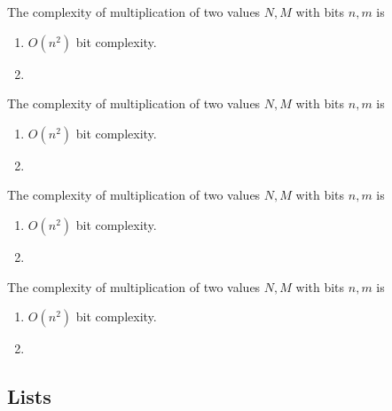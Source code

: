   \begin{theorem}
    The complexity of multiplication of two values $N, M$ with bits $n, m$ is 
    \begin{enumerate}
      \item $O(n^2)$ bit complexity. 
      \item 
    \end{enumerate}
  \end{theorem}

  \begin{theorem}
    The complexity of multiplication of two values $N, M$ with bits $n, m$ is 
    \begin{enumerate}
      \item $O(n^2)$ bit complexity. 
      \item 
    \end{enumerate}
  \end{theorem}

  \begin{theorem}
    The complexity of multiplication of two values $N, M$ with bits $n, m$ is 
    \begin{enumerate}
      \item $O(n^2)$ bit complexity. 
      \item 
    \end{enumerate}
  \end{theorem}

  \begin{theorem}
    The complexity of multiplication of two values $N, M$ with bits $n, m$ is 
    \begin{enumerate}
      \item $O(n^2)$ bit complexity. 
      \item 
    \end{enumerate}
  \end{theorem}

  \begin{definition}[Factorial]
    
  \end{definition}

\subsection{Lists} 

  \begin{definition}
    
  \end{definition}

